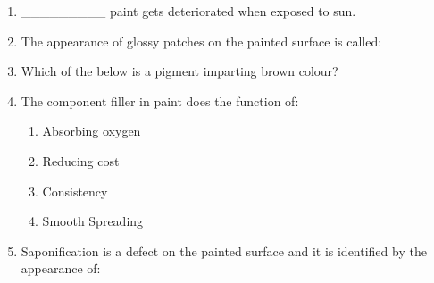 \documentclass[11pt,a4paper]{article}
\begin{document}
\begin{enumerate}
\\
\item{\_\_\_\_\_\_\_\_\_ paint gets deteriorated when exposed to sun.}
\\
\item{The appearance of glossy patches on the painted surface is called:}
\\
\item{Which of the below is a pigment imparting brown colour?}
\\
\item{The component filler in paint does the function of:}
\begin{enumerate}[label=\Alph*.]
\item{Absorbing oxygen}
\item{Reducing cost}
\item{Consistency}
\item{Smooth Spreading}
\end{enumerate}
\item{Saponification is a defect on the painted surface and it is identified by the appearance of:}
\\\begin{enumerate*}[itemjoin=\qquad, label=\Alph*.]

\end{enumerate*}
\end{enumerate}
\end{document}
